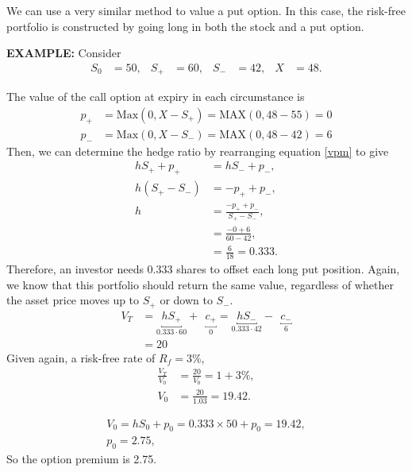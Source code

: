 \documentclass[../notes_compiled.tex]{subfiles}
\begin{document}
\begin{itemize}
\item We can use a very similar method to value a put option. In this case, the risk-free portfolio is constructed by going long in both the stock and a put option.

{\color{RedViolet}
\item[] \textbf{EXAMPLE:} Consider
\begin{align*}
S_{0}&=50, & S_{+}&=60, & S_{-}&=42, & X&=48.
\end{align*}
}
{\color{RoyalBlue}
The value of the call option at expiry in each circumstance is
\begin{align*}
p_{+}&=\text{Max}(0,X-S_{+})=\text{MAX}(0, 48-55)=0 \\
p_{-}&=\text{Max}(0,X-S_{-})=\text{MAX}(0, 48-42)=6
\end{align*}
Then, we can determine the hedge ratio by rearranging equation \ref{vpm} to give
\begin{align*}
hS_{+} + p_{+} &=hS_{-}+p_{-}, \\
h(S_{+} - S_{-})&=-p_{+} + p_{-}, \\
h&=\frac{-p_{+}+p_{-}}{S_{+}-S_{-}}, \\
&=\frac{-0+6}{60-42}, \\
&= \frac{6}{18} = 0.333.
\end{align*}
Therefore, an investor needs 0.333 shares to offset each long put position. Again, we know that this portfolio should return the same value, regardless of whether the asset price moves up to $S_{+}$ or down to $S_{-}$.
\begin{align*}
V_{T} &=\underbracket{hS_{+}}_{0.333\cdot60}+\phantom{,}\underbracket{c_{+}}_{0} = \underbracket{hS_{-}}_{0.333\cdot42}-\phantom{,}\underbracket{c_{-}}_{6} \\
&=20
\end{align*}
Given again, a risk-free rate of $R_{f}=3\%$, 
\begin{align*}
\frac{V_{T}}{V_{0}} &= \frac{20}{V_{0}} = 1+3\%, \\
V_{0}&=\frac{20}{1.03}=19.42.
\end{align*}

\begin{gather*}
V_{0}=hS_{0}+p_{0} = 0.333\times50 +p_{0} = 19.42, \\
p_{0}=2.75,
\end{gather*}
So the option premium is 2.75.
}

\end{itemize}
\end{document}
